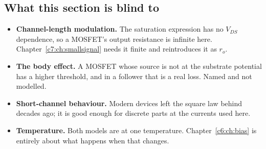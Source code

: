 \subsection{What this section is blind to}
\label{c5:sec:b5}
\begin{itemize}
  \item \textbf{Channel-length modulation.} The saturation expression has no $V_{DS}$ dependence, so a MOSFET's output resistance is infinite here. Chapter~\ref{c7:ch:smallsignal} needs it finite and reintroduces it as $r_o$.
  \item \textbf{The body effect.} A MOSFET whose source is not at the substrate potential has a higher threshold, and in a follower that is a real loss. Named and not modelled.
  \item \textbf{Short-channel behaviour.} Modern devices left the square law behind decades ago; it is good enough for discrete parts at the currents used here.
  \item \textbf{Temperature.} Both models are at one temperature. Chapter~\ref{c6:ch:bias} is entirely about what happens when that changes.
\end{itemize}
